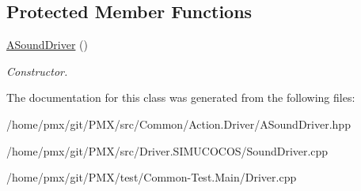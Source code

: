 \subsection*{Protected Member Functions}
\begin{DoxyCompactItemize}
\item 
\mbox{\label{classASoundDriver_a8feb8c4ad2739e174b239225eb625d53}} 
\hyperlink{classASoundDriver_a8feb8c4ad2739e174b239225eb625d53}{A\+Sound\+Driver} ()
\begin{DoxyCompactList}\small\item\em Constructor. \end{DoxyCompactList}\end{DoxyCompactItemize}


The documentation for this class was generated from the following files\+:\begin{DoxyCompactItemize}
\item 
/home/pmx/git/\+P\+M\+X/src/\+Common/\+Action.\+Driver/A\+Sound\+Driver.\+hpp\item 
/home/pmx/git/\+P\+M\+X/src/\+Driver.\+S\+I\+M\+U\+C\+O\+C\+O\+S/Sound\+Driver.\+cpp\item 
/home/pmx/git/\+P\+M\+X/test/\+Common-\/\+Test.\+Main/Driver.\+cpp\end{DoxyCompactItemize}
